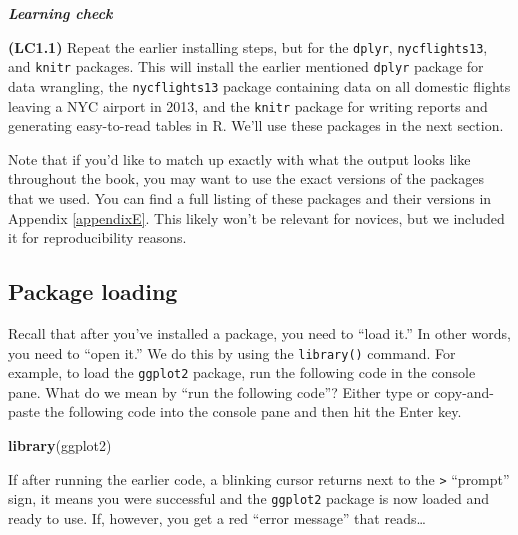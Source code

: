 \documentclass[]{book}
\newenvironment{Shaded}{\begin{snugshade}}{\end{snugshade}}
\newcommand{\KeywordTok}[1]{\textcolor[rgb]{0.13,0.29,0.53}{\textbf{#1}}}
\newcommand{\NormalTok}[1]{#1}
\begin{document}
\begin{learncheck}
\vspace{-0.25in}

\textbf{\emph{Learning check}} \vspace{-0.25in}
\end{learncheck}

\textbf{(LC1.1)} Repeat the earlier installing steps, but for the \texttt{dplyr}, \texttt{nycflights13}, and \texttt{knitr} packages. This will install the earlier mentioned \texttt{dplyr} package for data wrangling, the \texttt{nycflights13} package containing data on all domestic flights leaving a NYC airport in 2013, and the \texttt{knitr} package for writing reports and generating easy-to-read tables in R. We'll use these packages in the next section.

\begin{learncheck}
\vspace{-0.25in}
\vspace{-0.25in}
\end{learncheck}

Note that if you'd like to match up exactly with what the output looks like throughout the book, you may want to use the exact versions of the packages that we used. You can find a full listing of these packages and their versions in Appendix \ref{appendixE}. This likely won't be relevant for novices, but we included it for reproducibility reasons.

\hypertarget{package-loading}{%
\subsection{Package loading}\label{package-loading}}

Recall that after you've installed a package, you need to ``load it.'' In other words, you need to ``open it.'' We do this by using the \texttt{library()} command.  For example, to load the \texttt{ggplot2} package, run the following code in the console pane. What do we mean by ``run the following code''? Either type or copy-and-paste the following code into the console pane and then hit the Enter key.

\begin{Shaded}
\begin{Highlighting}[]
\KeywordTok{library}\NormalTok{(ggplot2)}
\end{Highlighting}
\end{Shaded}

If after running the earlier code, a blinking cursor returns next to the \texttt{\textgreater{}} ``prompt'' sign, it means you were successful and the \texttt{ggplot2} package is now loaded and ready to use. If, however, you get a red ``error message'' that reads\ldots{} 
\end{document}
